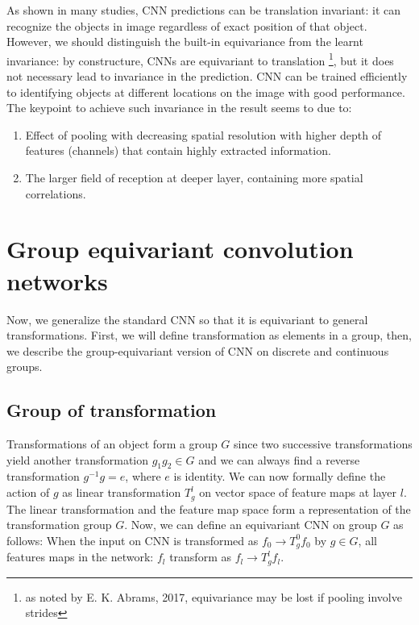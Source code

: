 \documentclass{article}
\begin{document}
\vspace{10pt}
As shown in many studies, CNN predictions can be translation invariant: it can recognize the objects in 
image regardless of exact position of that object. However, we should distinguish the built-in equivariance 
from the learnt invariance\cite{kauderer-abrams_quantifying_2017}: 
by constructure, CNNs are equivariant to translation \footnote{as noted by E. K. Abrams, 2017, equivariance may be lost if pooling involve strides}, 
but it does not necessary lead to invariance in the prediction. 
CNN can be trained efficiently to identifying objects at different locations on the image with good performance.
The keypoint to achieve such invariance in the result seems to due to:
\begin{enumerate}
    \item Effect of pooling with decreasing spatial resolution with higher depth of features (channels) that contain highly extracted information.
    \item The larger field of reception at deeper layer, containing more spatial correlations. 
\end{enumerate}

\section{Group equivariant convolution networks}

Now, we generalize the standard CNN so that it is equivariant to general transformations. First, we will define transformation 
as elements in a group, then, we describe the group-equivariant version of CNN on discrete and continuous groups. 

\subsection*{Group of transformation}
Transformations of an object form a group $G$ since 
two successive transformations yield another transformation $g_1g_2\in G$ and 
we can always find a reverse transformation $g^{-1}g = e$, where $e$ is identity. We can now formally define the 
action of $g$ as linear transformation $T_g^l$ on vector space of feature maps at layer $l$. The linear transformation 
and the feature map space form a representation of the transformation group $G$. 
Now, we can define an equivariant CNN on group $G$ as follows: 
When the input on CNN is transformed as $f_0\to T_g^0f_0$ by $g\in G$, all features maps 
in the network: $f_l$ transform as $f_l \to T_g^lf_l$. 
\end{document}

